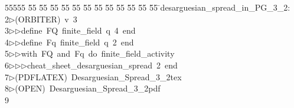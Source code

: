%
%
\begin{tabbing}
55555 \= 55 \= 55 \= 55 \= 55 \= 55 \= 55 \= 55 \= 55 \= 55 \= 55 \= 55 \= 55 \= \>desarguesian\_spread\_in\_PG\_3\_2:\\[0pt]
2\>$\triangleright$\>(ORBITER)\ v\ 3\ \\[0pt]
3\>$\triangleright$\>$\triangleright$\>define\ FQ\ finite\_field\ q\ 4\ end\ \\[0pt]
4\>$\triangleright$\>$\triangleright$\>define\ Fq\ finite\_field\ q\ 2\ end\ \\[0pt]
5\>$\triangleright$\>$\triangleright$\>with\ FQ\ and\ Fq\ do\ finite\_field\_activity\ \\[0pt]
6\>$\triangleright$\>$\triangleright$\>$\triangleright$\>cheat\_sheet\_desarguesian\_spread\ 2\ end\\[0pt]
7\>$\triangleright$\>(PDFLATEX)\ Desarguesian\_Spread\_3\_2tex\\[0pt]
8\>$\triangleright$\>(OPEN)\ Desarguesian\_Spread\_3\_2pdf\\[0pt]
9\>\end{tabbing}
